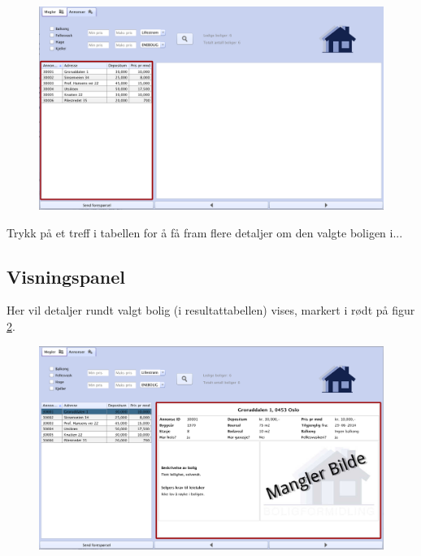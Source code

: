 \begin{figure}[h!]
 \includegraphics[width=\textwidth,height=\textheight,keepaspectratio]{./img/brukerveiledning/3.png}
 \caption{}
 \label{fig:bv:3}
\end{figure}

Trykk på et treff i tabellen for å få fram flere detaljer om den valgte boligen i...




\newpage
\subsection{Visningspanel}

Her vil detaljer rundt valgt bolig (i resultattabellen) vises, markert i rødt på figur \ref{fig:bv:4}.


\begin{figure}[h!]
 \includegraphics[width=\textwidth,height=\textheight,keepaspectratio]{./img/brukerveiledning/4.png}
 \caption{}
 \label{fig:bv:4}
\end{figure}







